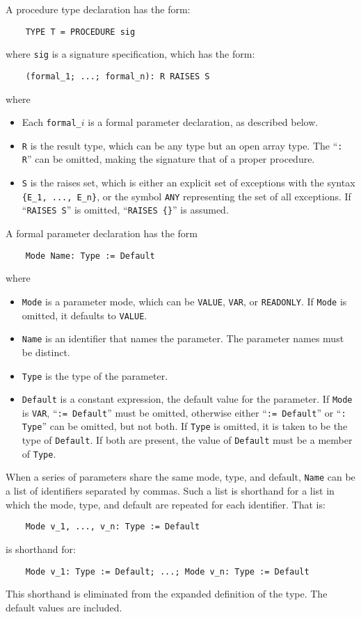 \documentclass[10pt]{article}
\begin{document}
A procedure type declaration has the form:
\begin{verbatim}
    TYPE T = PROCEDURE sig
\end{verbatim}
where \verb|sig| is a signature specification, which has the form:
\begin{verbatim}
    (formal_1; ...; formal_n): R RAISES S
\end{verbatim}
where
\begin{itemize}
\item Each \verb|formal_|$i$ is a formal parameter declaration, as described
  below.
\item \verb|R| is the result type, which can be any type but an open array
  type.  The ``\verb|: R|'' can be omitted, making the signature that of a
  proper procedure.
\item \verb|S| is the raises set, which is either an explicit set of
  exceptions with the syntax \verb|{E_1, ..., E_n}|, or the symbol \verb|ANY|
  representing the set of all exceptions.  If ``\verb|RAISES S|'' is omitted,
  ``\verb|RAISES {}|'' is assumed.
\end{itemize}

A formal parameter declaration has the form
\begin{verbatim}
    Mode Name: Type := Default
\end{verbatim}
where
\begin{itemize}
\item \verb|Mode| is a parameter mode, which can be \verb|VALUE|, \verb|VAR|,
  or \verb|READONLY|.  If \verb|Mode| is omitted, it defaults to \verb|VALUE|.
\item \verb|Name| is an identifier that names the parameter.  The parameter
  names must be distinct.
\item \verb|Type| is the type of the parameter.
\item \verb|Default| is a constant expression, the default value for the
  parameter.  If \verb|Mode| is \verb|VAR|, ``\verb|:= Default|'' must be
  omitted, otherwise either ``\verb|:= Default|'' or ``\verb|: Type|'' can be
  omitted, but not both.  If \verb|Type| is omitted, it is taken to be the
  type of \verb|Default|. If both are present, the value of \verb|Default|
  must be a member of \verb|Type|.
\end{itemize}

When a series of parameters share the same mode, type, and default,
\verb|Name| can be a list of identifiers separated by commas.  Such a list is
shorthand for a list in which the mode, type, and default are repeated for
each identifier.  That is:
\begin{verbatim}
    Mode v_1, ..., v_n: Type := Default
\end{verbatim}
is shorthand for:
\begin{verbatim}
    Mode v_1: Type := Default; ...; Mode v_n: Type := Default
\end{verbatim}
This shorthand is eliminated from the expanded definition of the type.  The
default values are included.
\end{document}

